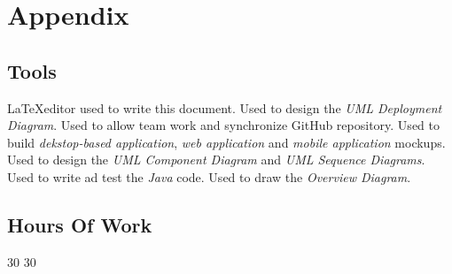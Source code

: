 \section{Appendix}
\subsection{Tools}
\begin{itemize}
	 \LaTeX editor used to write this document.
	 Used to design the \textit{UML Deployment Diagram}.
	 Used to allow team work and synchronize GitHub repository.
	 Used to build \textit{dekstop-based application}, \textit{web application} and \textit{mobile application} mockups.
	 Used to design the \textit{UML Component Diagram} and \textit{UML Sequence Diagrams}.
	 Used to write ad test the \textit{Java} code.
	 Used to draw the \textit{Overview Diagram}.
\end{itemize}
\subsection{Hours Of Work}
\begin{itemize}
	 30
	 30
\end{itemize}